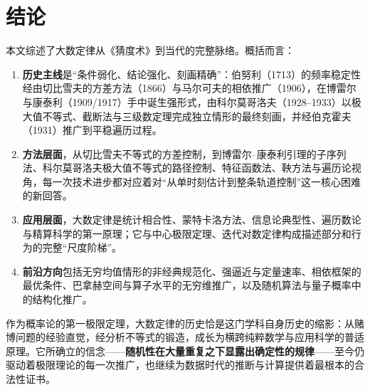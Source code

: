 \section{结论}\label{sec:conclusion}

本文综述了大数定律从《猜度术》到当代的完整脉络。概括而言：

\begin{enumerate}[label=(\arabic*)]
    \item \textbf{历史主线}是“条件弱化、结论强化、刻画精确”：伯努利（1713）的频率稳定性经由切比雪夫的方差方法（1866）与马尔可夫的相依推广（1906），在博雷尔与康泰利（1909/1917）手中诞生强形式，由科尔莫哥洛夫（1928--1933）以极大值不等式、截断法与三级数定理完成独立情形的最终刻画，并经伯克霍夫（1931）推广到平稳遍历过程。
    \item \textbf{方法层面}，从切比雪夫不等式的方差控制，到博雷尔--康泰利引理的子序列法、科尔莫哥洛夫极大值不等式的路径控制、特征函数法、鞅方法与遍历论视角，每一次技术进步都对应着对“从单时刻估计到整条轨道控制”这一核心困难的新回答。
    \item \textbf{应用层面}，大数定律是统计相合性、蒙特卡洛方法、信息论典型性、遍历数论与精算科学的第一原理；它与中心极限定理、迭代对数定律构成描述部分和行为的完整“尺度阶梯”。
    \item \textbf{前沿方向}包括无穷均值情形的非经典规范化、强逼近与定量速率、相依框架的最优条件、巴拿赫空间与算子水平的无穷维推广，以及随机算法与量子概率中的结构化推广。
\end{enumerate}

作为概率论的第一极限定理，大数定律的历史恰是这门学科自身历史的缩影：从赌博问题的经验直觉，经分析不等式的锻造，成长为横跨纯粹数学与应用科学的普适原理。它所确立的信念——\textbf{随机性在大量重复之下显露出确定性的规律}——至今仍驱动着极限理论的每一次推广，也继续为数据时代的推断与计算提供着最根本的合法性证书。
